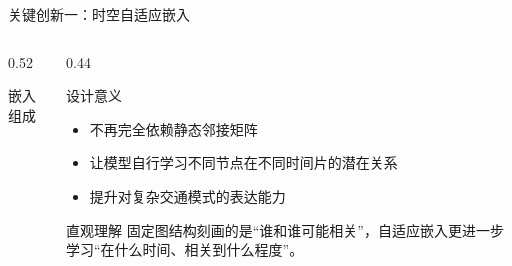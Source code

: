 \documentclass[10pt,aspectratio=169]{ctexbeamer}
\begin{document}
\begin{frame}{关键创新一：时空自适应嵌入}
  \begin{columns}[T]
    \begin{column}{0.52\textwidth}
      \begin{block}{嵌入组成}
        \begin{table}
          \centering
          \scriptsize
          \renewcommand{\arraystretch}{1.14}
        \end{table}
      \end{block}
    \end{column}
    \begin{column}{0.44\textwidth}
      \begin{alertblock}{设计意义}
        \begin{itemize}
          \item 不再完全依赖静态邻接矩阵
          \item 让模型自行学习不同节点在不同时间片的潜在关系
          \item 提升对复杂交通模式的表达能力
        \end{itemize}
      \end{alertblock}

      \begin{exampleblock}{直观理解}
        固定图结构刻画的是“谁和谁可能相关”，自适应嵌入更进一步学习“在什么时间、相关到什么程度”。
      \end{exampleblock}
    \end{column}
  \end{columns}
\end{frame}
\end{document}
